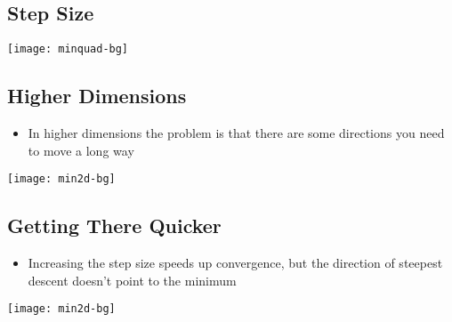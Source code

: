 

\begin{slide}
\section[1]{Step Size}

\pb
\begin{center}
  \texttt{[image: minquad-bg]}\pause
\end{center}
\end{slide}


\begin{slide}
\section{Higher Dimensions}

\pb
\begin{itemize}
\item In higher dimensions the problem is that there are some directions
  you need to move a long way\pauseh
\end{itemize}
\begin{center}
  \texttt{[image: min2d-bg]}\pause
\end{center}
\end{slide}


\begin{slide}
\section{Getting There Quicker}

\pb
\begin{itemize}
\item Increasing the step size speeds up convergence, but the direction
  of steepest descent doesn't point to the minimum\pauseh
\end{itemize}
\begin{center}
  \texttt{[image: min2d-bg]}\pause
\end{center}
\end{slide}

